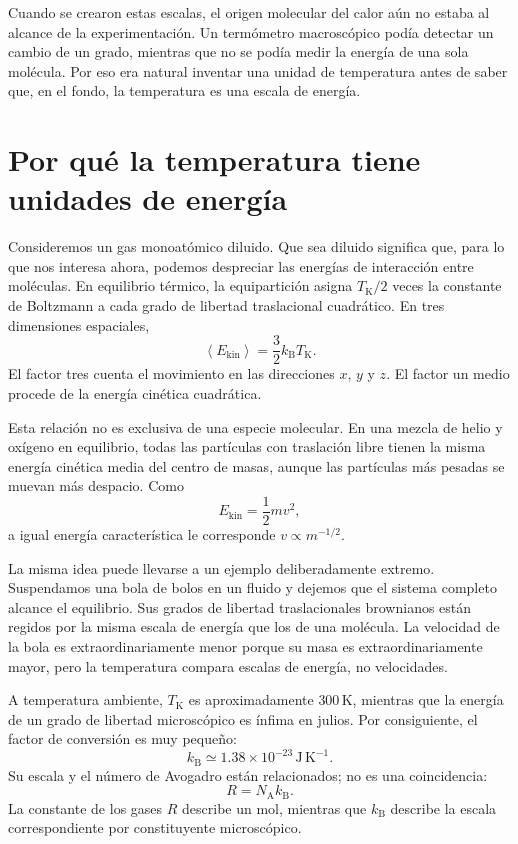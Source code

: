 Cuando se crearon estas escalas, el origen molecular del calor aún no estaba al alcance de la experimentación. Un termómetro macroscópico podía detectar un cambio de un grado, mientras que no se podía medir la energía de una sola molécula. Por eso era natural inventar una unidad de temperatura antes de saber que, en el fondo, la temperatura es una escala de energía.

\section{Por qué la temperatura tiene unidades de energía}

Consideremos un gas monoatómico diluido. Que sea diluido significa que, para lo que nos interesa ahora, podemos despreciar las energías de interacción entre moléculas. En equilibrio térmico, la equipartición asigna \(T_{\mathrm K}/2\) veces la constante de Boltzmann a cada grado de libertad traslacional cuadrático. En tres dimensiones espaciales,
\begin{equation}
 \left\langle E_{\mathrm{kin}}\right\rangle
 =\frac{3}{2}k_{\mathrm B}T_{\mathrm K}.
 \label{eq:sm2-equipartition-kelvin}
\end{equation}
El factor tres cuenta el movimiento en las direcciones \(x\), \(y\) y \(z\). El factor un medio procede de la energía cinética cuadrática.

Esta relación no es exclusiva de una especie molecular. En una mezcla de helio y oxígeno en equilibrio, todas las partículas con traslación libre tienen la misma energía cinética media del centro de masas, aunque las partículas más pesadas se muevan más despacio. Como
\begin{equation}
 E_{\mathrm{kin}}=\frac{1}{2}mv^2,
\end{equation}
a igual energía característica le corresponde \(v\propto m^{-1/2}\).

La misma idea puede llevarse a un ejemplo deliberadamente extremo. Suspendamos una bola de bolos en un fluido y dejemos que el sistema completo alcance el equilibrio. Sus grados de libertad traslacionales brownianos están regidos por la misma escala de energía que los de una molécula. La velocidad de la bola es extraordinariamente menor porque su masa es extraordinariamente mayor, pero la temperatura compara escalas de energía, no velocidades.

A temperatura ambiente, \(T_{\mathrm K}\) es aproximadamente \(300\,\mathrm K\), mientras que la energía de un grado de libertad microscópico es ínfima en julios. Por consiguiente, el factor de conversión es muy pequeño:
\begin{equation}
 k_{\mathrm B}\simeq 1.38\times10^{-23}\,
 \mathrm{J\,K^{-1}}.
 \label{eq:sm2-boltzmann-value}
\end{equation}
Su escala y el número de Avogadro están relacionados; no es una coincidencia:
\begin{equation}
 R=N_{\mathrm A}k_{\mathrm B}.
\end{equation}
La constante de los gases \(R\) describe un mol, mientras que \(k_{\mathrm B}\) describe la escala correspondiente por constituyente microscópico.

